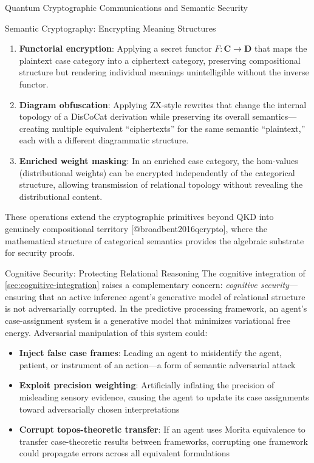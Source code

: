 \documentclass[
  ignorenonframetext,
]{beamer}
\providecommand{\tightlist}{%
  \setlength{\itemsep}{0pt}\setlength{\parskip}{0pt}}
\begin{document}
\begin{frame}{Quantum Cryptographic Communications and Semantic
Security}
\begin{block}{Semantic Cryptography: Encrypting Meaning Structures}
\begin{enumerate}
\tightlist
\item
  \textbf{Functorial encryption}: Applying a secret functor
  \(F\colon \mathbf{C} \to \mathbf{D}\) that maps the plaintext case
  category into a ciphertext category, preserving compositional
  structure but rendering individual meanings unintelligible without the
  inverse functor.
\item
  \textbf{Diagram obfuscation}: Applying ZX-style rewrites that change
  the internal topology of a DisCoCat derivation while preserving its
  overall semantics---creating multiple equivalent ``ciphertexts'' for
  the same semantic ``plaintext,'' each with a different diagrammatic
  structure.
\item
  \textbf{Enriched weight masking}: In an enriched case category, the
  hom-values (distributional weights) can be encrypted independently of
  the categorical structure, allowing transmission of relational
  topology without revealing the distributional content.
\end{enumerate}

These operations extend the cryptographic primitives beyond QKD into
genuinely compositional territory {[}@broadbent2016qcrypto{]}, where the
mathematical structure of categorical semantics provides the algebraic
substrate for security proofs.
\end{block}

\begin{block}{Cognitive Security: Protecting Relational Reasoning}
\protect{}\label{cognitive-security-protecting-relational-reasoning}
The cognitive integration of \autoref{sec:cognitive-integration} raises
a complementary concern: \emph{cognitive security}---ensuring that an
active inference agent's generative model of relational structure is not
adversarially corrupted. In the predictive processing framework, an
agent's case-assignment system is a generative model that minimizes
variational free energy. Adversarial manipulation of this system could:

\begin{itemize}
\tightlist
\item
  \textbf{Inject false case frames}: Leading an agent to misidentify the
  agent, patient, or instrument of an action---a form of semantic
  adversarial attack
\item
  \textbf{Exploit precision weighting}: Artificially inflating the
  precision of misleading sensory evidence, causing the agent to update
  its case assignments toward adversarially chosen interpretations
\item
  \textbf{Corrupt topos-theoretic transfer}: If an agent uses Morita
  equivalence to transfer case-theoretic results between frameworks,
  corrupting one framework could propagate errors across all equivalent
  formulations
\end{itemize}


\end{block}
\end{frame}
\end{document}

